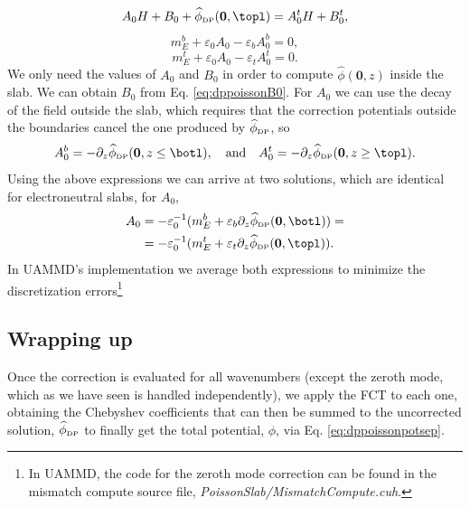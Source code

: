 \documentclass[twoside,openright,titlepage,numbers=noenddot,%
headinclude,footinclude,cleardoublepage=empty,abstract=on,
BCOR=5mm,fontsize=11pt, dvipsnames, paper=b5
]{scrreprt}
\renewcommand{\vec}[1]{\bm{#1}}
\newcommand{\uammd}{\gls{UAMMD}\xspace}
\newcommand{\fou}[1]{\widehat{#1}}
\newcommand{\corr}{\text{corr}}
\newcommand{\dpr}{\text{\tiny DP}}
\begin{document}
\begin{equation}
  A_0H + B_0 + \fou{\phi}_{\dpr}(\vec{0}, \topl) = A_0^tH + B_0^t,
\end{equation}
\begin{equation}
  m_E^b +\varepsilon_0A_0-\varepsilon_bA_0^b = 0,
\end{equation}
\begin{equation}
  m_E^t +\varepsilon_0A_0-\varepsilon_tA_0^t = 0.
\end{equation}
We only need the values of $A_0$ and $B_0$ in order to compute $\fou{\phi}(\vec{0},z)$ inside the slab. We can obtain $B_0$ from Eq. \eqref{eq:dppoissonB0}. For $A_0$ we can use the decay of the field outside the slab, which requires that the correction potentials outside the boundaries cancel the one produced by $\fou{\phi}_{\dpr}$, so
\begin{equation}
  A_0^b = -\partial_z\fou{\phi}_{\dpr}(\vec{0}, z\le\botl),\quad\text{and}\quad A_0^t = -\partial_z\fou{\phi}_{\dpr}(\vec{0}, z\ge\topl).
\end{equation}
Using the above expressions we can arrive at two solutions, which are identical for electroneutral slabs, for $A_0$,
\begin{equation}
  \begin{aligned}
    A_0 &= -\varepsilon_0^{-1}(m_E^b +\varepsilon_b\partial_z\fou{\phi}_{\dpr}(\vec{0}, \botl)) =\\
    &= -\varepsilon_0^{-1}(m_E^t +\varepsilon_t\partial_z\fou{\phi}_{\dpr}(\vec{0}, \topl)).
\end{aligned}
\end{equation}
In \uammd's implementation we average both expressions to minimize the discretization errors\footnote{In \uammd, the code for the zeroth mode correction can be found in the mismatch compute source file, \emph{PoissonSlab/MismatchCompute.cuh}.}

%
%
%

\subsection{Wrapping up}
Once the correction is evaluated for all wavenumbers (except the zeroth mode, which as we have seen is handled independently), we apply the \gls{FCT} to each one, obtaining the Chebyshev coefficients that can then be summed to the uncorrected solution, $\fou{\phi}_{\dpr}$ to finally get the total potential, $\phi$, via Eq. \eqref{eq:dppoissonpotsep}.
\end{document}
